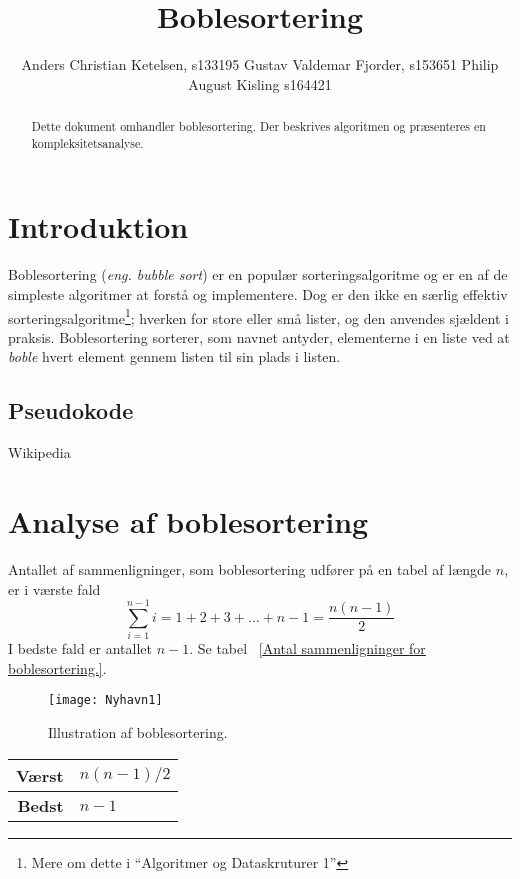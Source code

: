 \documentclass[12pt,a4paper]{article}
\author{Anders Christian Ketelsen, s133195 Gustav Valdemar Fjorder, s153651 Philip August Kisling s164421}
\title{Boblesortering}
\begin{document}
\maketitle
\begin{abstract}
Dette dokument omhandler boblesortering. Der beskrives algoritmen og præsenteres en kompleksitetsanalyse.
\end{abstract}
\section{Introduktion}

Boblesortering (\textsl{eng. bubble sort}) er en populær sorteringsalgoritme og er en af de simpleste algoritmer at forstå og implementere. Dog er den ikke en særlig effektiv sorteringsalgoritme\footnote{Mere om dette i ``Algoritmer og Dataskruturer 1''}; hverken for store eller små lister, og den anvendes sjældent i praksis. Boblesortering sorterer, som navnet antyder, elementerne i en liste ved at \textsl{boble} hvert element gennem listen til sin plads i listen.


\subsection{Pseudokode}
Wikipedia 



\section{Analyse af boblesortering}
Antallet af sammenligninger, som boblesortering udfører på en tabel af længde $n$, er i værste fald
\[\sum_{i=1}^{n-1}i=1+2+3+...+n-1=\frac{n(n-1)}{2}\]
I bedste fald er antallet $n-1$. Se tabel ~\ref{Antal sammenligninger for boblesortering.}.

\begin{figure}
\centering
\texttt{[image: Nyhavn1]}\caption{Illustration af boblesortering.}\label{fig:nyhavn}
\end{figure}

\begin{tabular}{|r|l|}
\hline
\textbf{Værst} & $n(n-1)/2$\\
\hline
\textbf{Bedst}& $n-1$\\

\end{tabular}
\end{document}

